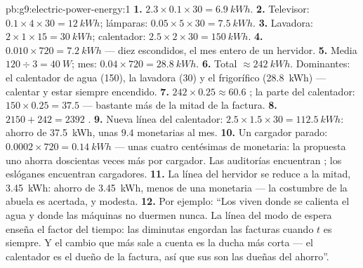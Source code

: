 \begin{solution}{pb:g9:electric-power-energy:1}
\textbf{1.} $2.3 \times 0.1 \times 30 = \qty{6.9}{kWh}$.
\textbf{2.} Televisor: $0.1 \times 4 \times 30 = \qty{12}{kWh}$;
lámparas: $0.05 \times 5 \times 30 = \qty{7.5}{kWh}$.
\textbf{3.} Lavadora: $2 \times 1 \times 15 = \qty{30}{kWh}$;
calentador: $2.5 \times 2 \times 30 = \qty{150}{kWh}$.
\textbf{4.} $0.010 \times 720 = \qty{7.2}{kWh}$ --- diez
 escondidos, el mes entero de un hervidor.
\textbf{5.} Media $120 \div 3 = \qty{40}{W}$; mes: $0.04 \times 720 =
\qty{28.8}{kWh}$.
\textbf{6.} Total $\approx \qty{242}{kWh}$. Dominantes: el calentador
de agua (\qty{150}{}), la lavadora (\qty{30}{}) y el frigorífico
(\qty{28.8}{kWh}) --- calentar y estar siempre encendido.
\textbf{7.} $242 \times 0.25 \approx 60.6$ ; la parte del
calentador: $150 \times 0.25 = 37.5$ --- bastante más de la mitad de la
factura.
\textbf{8.} $2150 + 242 = 2392$ .
\textbf{9.} Nueva línea del calentador: $2.5 \times 1.5 \times 30 =
\qty{112.5}{kWh}$: ahorro de \qty{37.5}{kWh}, unas $9.4$
 monetarias al mes.
\textbf{10.} Un cargador parado: $0.0002 \times 720 =
\qty{0.14}{kWh}$ --- unas cuatro centésimas de  monetaria:
la propuesta uno ahorra doscientas veces más por cargador. Las
auditorías encuentran ; los eslóganes encuentran
cargadores.
\textbf{11.} La línea del hervidor se reduce a la mitad,
\qty{3.45}{kWh}: ahorro de \qty{3.45}{kWh}, menos de una
 monetaria --- la costumbre de la abuela es acertada, y
modesta.
\textbf{12.} Por ejemplo: ``Los  viven donde se
calienta el agua y donde las máquinas no duermen nunca. La línea del
modo de espera enseña el factor del tiempo: las 
diminutas engordan las facturas cuando $t$ es siempre. Y el cambio que
más sale a cuenta es la ducha más corta --- el calentador es el dueño de
la factura, así que sus  son las dueñas del ahorro''.
\end{solution}
